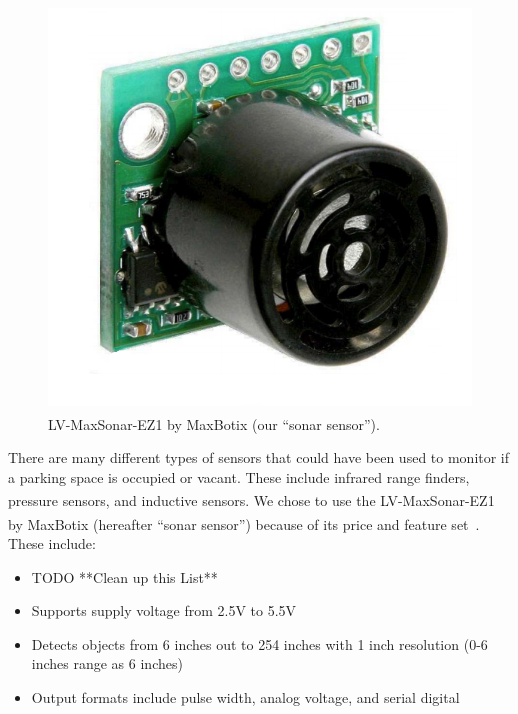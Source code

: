 \documentclass{acm_proc}
\begin{document}
\begin{figure}
    \begin{center}
		\includegraphics[width=\columnwidth]{figures/range_finder}
	\end{center}
	\caption{LV-MaxSonar\textsuperscript{\textregistered}-EZ1\textsuperscript{\texttrademark}
	by MaxBotix\textsuperscript{\textregistered} (our ``sonar sensor'').}
	\label{fig:range_finder}
\end{figure}

There are many different types of sensors that could have been used to
monitor if a parking space is occupied or vacant.  These include infrared
range finders, pressure sensors, and inductive sensors.
We chose to use the
LV-MaxSonar\textsuperscript{\textregistered}-EZ1\textsuperscript{\texttrademark}
by MaxBotix\textsuperscript{\textregistered} (hereafter ``sonar sensor'')
because of its price and feature set~\cite{maxbotix:maxsonar-datasheet}.
These include:
\begin{itemize}
	\item TODO **Clean up this List**
	\item Supports supply voltage from 2.5V to 5.5V
	\item Detects objects from 6 inches out to 254 inches with 1 inch
	resolution (0-6 inches range as 6 inches)
	\item Output formats include pulse width, analog voltage, and serial digital
\end{itemize}
\end{document}
